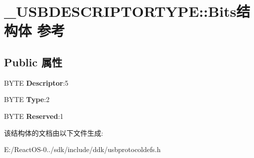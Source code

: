 \hypertarget{struct___u_s_b_d_e_s_c_r_i_p_t_o_r_t_y_p_e_1_1_bits}{}\section{\+\_\+\+U\+S\+B\+D\+E\+S\+C\+R\+I\+P\+T\+O\+R\+T\+Y\+PE\+:\+:Bits结构体 参考}
\label{struct___u_s_b_d_e_s_c_r_i_p_t_o_r_t_y_p_e_1_1_bits}
\subsection*{Public 属性}
\begin{DoxyCompactItemize}
\item 
\mbox{\label{struct___u_s_b_d_e_s_c_r_i_p_t_o_r_t_y_p_e_1_1_bits_a17423116cff681b3dd3f06b766754a5b}} 
B\+Y\+TE {\bfseries Descriptor}\+:5
\item 
\mbox{\label{struct___u_s_b_d_e_s_c_r_i_p_t_o_r_t_y_p_e_1_1_bits_aa1b07aaa2529d4afa671160919803dbe}} 
B\+Y\+TE {\bfseries Type}\+:2
\item 
\mbox{\label{struct___u_s_b_d_e_s_c_r_i_p_t_o_r_t_y_p_e_1_1_bits_aeeef5651d6fcde24cfd70d40378247b3}} 
B\+Y\+TE {\bfseries Reserved}\+:1
\end{DoxyCompactItemize}


该结构体的文档由以下文件生成\+:\begin{DoxyCompactItemize}
\item 
E\+:/\+React\+O\+S-\/0../sdk/include/ddk/usbprotocoldefs.\+h\end{DoxyCompactItemize}
